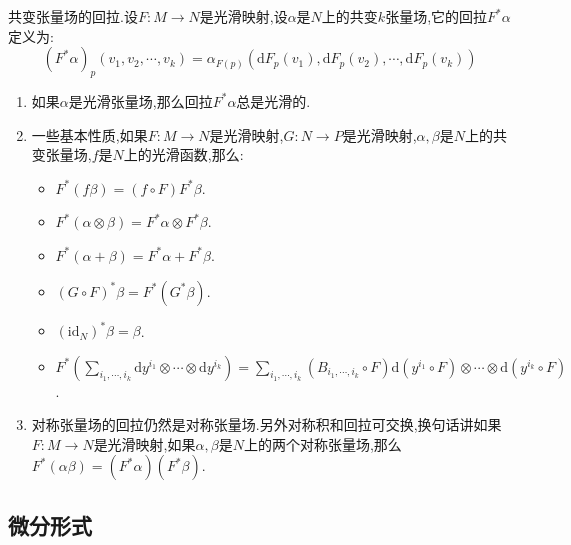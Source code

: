 共变张量场的回拉.设$F:M\to N$是光滑映射,设$\alpha$是$N$上的共变$k$张量场,它的回拉$F^*\alpha$定义为:
$$(F^*\alpha)_p(v_1,v_2,\cdots,v_k)=\alpha_{F(p)}(\mathrm{d}F_p(v_1),\mathrm{d}F_p(v_2),\cdots,\mathrm{d}F_p(v_k))$$
\begin{enumerate}
	\item 如果$\alpha$是光滑张量场,那么回拉$F^*\alpha$总是光滑的.
	\item 一些基本性质,如果$F:M\to N$是光滑映射,$G:N\to P$是光滑映射,$\alpha,\beta$是$N$上的共变张量场,$f$是$N$上的光滑函数,那么:
	\begin{itemize}
		\item $F^*(f\beta)=(f\circ F)F^*\beta$.
		\item $F^*(\alpha\otimes\beta)=F^*\alpha\otimes F^*\beta$.
		\item $F^*(\alpha+\beta)=F^*\alpha+F^*\beta$.
		\item $(G\circ F)^*\beta=F^*(G^*\beta)$.
		\item $(\mathrm{id}_N)^*\beta=\beta$.
		\item $F^*(\sum_{i_1,\cdots,i_k}\mathrm{d}y^{i_1}\otimes\cdots\otimes\mathrm{d}y^{i_k})=\sum_{i_1,\cdots,i_k}(B_{i_1,\cdots,i_k}\circ F)\mathrm{d}(y^{i_1}\circ F)\otimes\cdots\otimes\mathrm{d}(y^{i_k}\circ F)$.
	\end{itemize}
    \item 对称张量场的回拉仍然是对称张量场.另外对称积和回拉可交换,换句话讲如果$F:M\to N$是光滑映射,如果$\alpha,\beta$是$N$上的两个对称张量场,那么$F^*(\alpha\beta)=(F^*\alpha)(F^*\beta)$.
\end{enumerate}
\subsection{微分形式}

